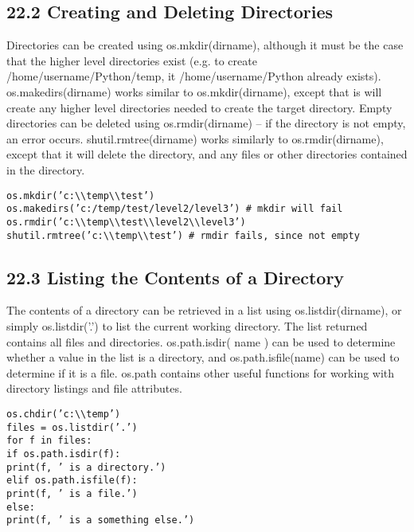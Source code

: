 \subsection{22.2 Creating and Deleting Directories}
Directories can be created using os.mkdir(dirname), although it must be the case that the higher level directories
exist (e.g. to create /home/username/Python/temp, it /home/username/Python already exists). os.makedirs(dirname)
works similar to os.mkdir(dirname), except that is will create any higher level directories needed to create
the target directory.
Empty directories can be deleted using os.rmdir(dirname) – if the directory is not empty, an error
occurs. shutil.rmtree(dirname) works similarly to os.rmdir(dirname), except that it will delete the directory,
and any files or other directories contained in the directory.
\begin{framed}
\begin{verbatim}
os.mkdir(’c:\\temp\\test’)
os.makedirs(’c:/temp/test/level2/level3’) # mkdir will fail
os.rmdir(’c:\\temp\\test\\level2\\level3’)
shutil.rmtree(’c:\\temp\\test’) # rmdir fails, since not empty
\end{verbatim}
\end{framed}
\subsection{22.3 Listing the Contents of a Directory}
The contents of a directory can be retrieved in a list using os.listdir(dirname), or simply os.listdir(’.’)
to list the current working directory. The list returned contains all files and directories. os.path.isdir(
name ) can be used to determine whether a value in the list is a directory, and os.path.isfile(name)
can be used to determine if it is a file. os.path contains other useful functions for working with directory
listings and file attributes.
\begin{framed}
\begin{verbatim}
os.chdir(’c:\\temp’)
files = os.listdir(’.’)
for f in files:
if os.path.isdir(f):
print(f, ’ is a directory.’)
elif os.path.isfile(f):
print(f, ’ is a file.’)
else:
print(f, ’ is a something else.’)
\end{verbatim}
\end{framed}


